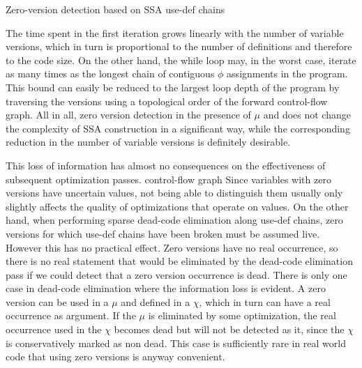 \begin{algorithm}[htpb]
  \caption{\label{alg:hssa:zero-versioning}Zero-version detection based on SSA use-def chains}
\end{algorithm}

The time spent in the first iteration grows linearly with the number of variable versions, which in turn is proportional to the number of definitions and therefore to the code size.
On the other hand, the while loop may, in the worst case, iterate as many times as the longest chain of contiguous $\phi$ assignments in the program. This bound can easily be reduced to the largest loop depth of the program by traversing the versions using a topological order of the forward control-flow graph.
All in all, zero version detection in the presence of $\mu$ and \chifuns does not change the complexity of SSA construction in a significant way, while the corresponding reduction in the number of variable versions is definitely desirable.

This loss of information has almost no consequences on the effectiveness of subsequent optimization passes.
control-flow graph
Since variables with zero versions have uncertain values, not being able to distinguish them usually only slightly affects the quality of optimizations that operate on values.
On the other hand, when performing sparse dead-code elimination along use-def chains, zero versions for which use-def chains have been broken must be assumed live. However this has no practical effect. Zero versions have no real occurrence, so there is no real statement that would be eliminated by the dead-code elimination pass if we could detect that a zero version occurrence is dead.
There is only one case in dead-code elimination where the information loss is evident. A zero version can be used in a $\mu$ and defined in a $\chi$, which in turn can have a real occurrence as argument. If the $\mu$ is eliminated by some optimization, the real occurrence used in the $\chi$ becomes dead but will not be detected as it, since the $\chi$ is conservatively marked as non dead. This case is sufficiently rare in real world code that using zero versions is anyway convenient.


